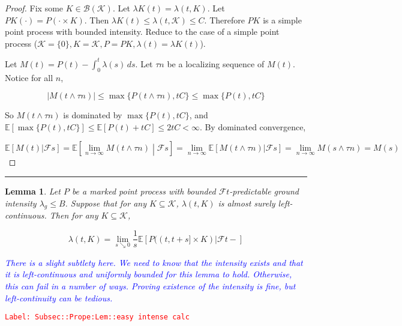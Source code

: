 \documentclass[12pt]{article}
\newcommand{\mb}{\mathbb}
\newcommand{\mc}{\mathcal}
\newcommand{\ms}{\mathscr}
\newcommand{\ra}{\rightarrow}
\newcommand{\tr}{\textcolor{red}}
\newcommand{\tb}{\textcolor{blue}}
\newcommand{\labe}[1]{\tr{\texttt{Label: #1}}}
\newcommand{\lin}{\rule{\linewidth}{0.4 pt}}
\newcommand{\ex}[1]{\mb{E}\left[#1\right]}			%
\renewcommand{\t}{t}							%
\renewcommand{\tt}{s}							%
\newcommand{\F}{\mc{F}}							%
\newcommand{\const}{C}							%
\newcommand{\rate}{\lambda}						%
\newcommand{\rt}{\tau}							%
\newcommand{\rp}{P}								%
\newcommand{\mspce}{\mc{K}}						%
\newtheorem{lem}[thms]{Lemma}
\begin{document}
\begin{proof}
Fix some \(K \in \ms{B}(\mspce)\). Let \(\rate{K}(\t) = \rate(\t,K)\). Let \(\rp{K}(\cdot) = \rp(\cdot\times K)\). Then \(\rate{K}(\t) \leq \rate(\t,\mspce) \leq \const\). Therefore \(\rp{K}\) is a simple point process with bounded intensity. Reduce to the case of a simple point process (\(\mspce = \{0\}, K = \mspce, \rp = \rp{K},\rate(\t) = \rate{K}(\t)\)).

Let \(M(\t) = \rp(\t) - \int_0^\t \rate(\tt)\,ds\). Let \(\rt{n}\) be a localizing sequence of \(M(\t)\). Notice for all \(n\),

\[|M(\t\wedge \rt{n})| \leq \max\{\rp(\t\wedge \rt{n}),\t\const\}\leq \max\{\rp(\t),\t\const\}\]

So \(M(\t\wedge\rt{n})\) is dominated by \(\max\{\rp(\t),\t\const\}\), and \(\ex{\max\{\rp(\t),\t\const\}} \leq \ex{\rp(\t) + \t\const} \leq 2\t\const < \infty\). By dominated convergence,

\[\ex{M(\t)|\F{\tt}} = \ex{\lim_{n\ra\infty} M(\t\wedge \rt{n})\middle|\F{\tt}} = \lim_{n\ra\infty}\ex{M(\t\wedge \rt{n})|\F{\tt}} = \lim_{n\ra\infty} M(\tt\wedge \rt{n}) = M(\tt)\]
\end{proof}

\lin

\begin{lem}
Let \(\rp\) be a marked point process with bounded \(\F{\t}\)-predictable ground intensity \(\rate_g\leq B\). Suppose that for any \(K \subseteq \mspce\), \(\rate(\t,K)\) is almost surely left-continuous. Then for any \(K \subseteq \mspce\),

\[\rate(\t,K) = \lim_{s\searrow 0}\frac{1}{\tt}\ex{\rp((\t,\t+\tt]\times K)|\F{\t-}}\]

\tb{There is a slight subtlety here. We need to know that the intensity exists and that it is left-continuous and uniformly bounded for this lemma to hold. Otherwise, this can fail in a number of ways. Proving existence of the intensity is fine, but left-continuity can be tedious.}

\label{Subsec::Prope:Lem::easy intense calc}
\end{lem}
\labe{Subsec::Prope:Lem::easy intense calc}
\end{document}

